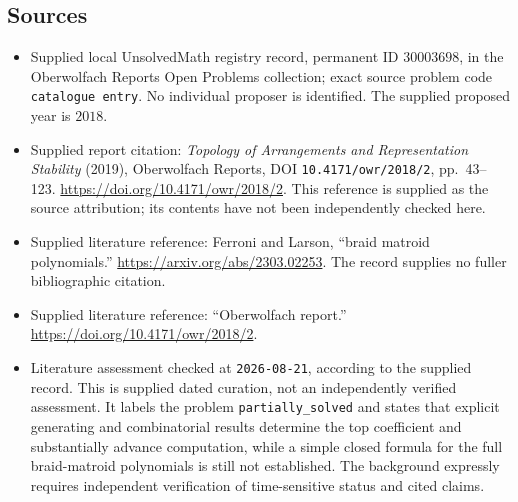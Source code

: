 \documentclass[11pt]{article}
\begin{document}
\subsection{Sources}
\begin{itemize}
\item Supplied local UnsolvedMath registry record, permanent ID \(30003698\), in the Oberwolfach Reports Open Problems collection; exact source problem code \texttt{catalogue entry}. No individual proposer is identified. The supplied proposed year is \(2018\).
\item Supplied report citation: \emph{Topology of Arrangements and Representation Stability} (2019), Oberwolfach Reports, DOI \texttt{10.4171/owr/2018/2}, pp.~43--123. \url{https://doi.org/10.4171/owr/2018/2}. This reference is supplied as the source attribution; its contents have not been independently checked here.
\item Supplied literature reference: Ferroni and Larson, ``braid matroid polynomials.'' \url{https://arxiv.org/abs/2303.02253}. The record supplies no fuller bibliographic citation.
\item Supplied literature reference: ``Oberwolfach report.'' \url{https://doi.org/10.4171/owr/2018/2}.
\item Literature assessment checked at \texttt{2026-08-21}, according to the supplied record. This is supplied dated curation, not an independently verified assessment. It labels the problem \texttt{partially\_solved} and states that explicit generating and combinatorial results determine the top coefficient and substantially advance computation, while a simple closed formula for the full braid-matroid polynomials is still not established. The background expressly requires independent verification of time-sensitive status and cited claims.
\end{itemize}
\end{document}
